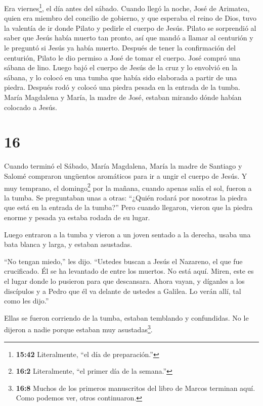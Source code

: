  Era viernes\footnote{\textbf{15:42} Literalmente, ``el día
  de preparación.''}, el día antes del sábado. Cuando llegó la noche,
 José de Arimatea, quien era miembro del concilio de
gobierno, y que esperaba el reino de Dios, tuvo la valentía de ir donde
Pilato y pedirle el cuerpo de Jesús.  Pilato se sorprendió
al saber que Jesús había muerto tan pronto, así que mandó a llamar al
centurión y le preguntó si Jesús ya había muerto.  Después
de tener la confirmación del centurión, Pilato le dio permiso a José de
tomar el cuerpo.  José compró una sábana de lino. Luego
bajó el cuerpo de Jesús de la cruz y lo envolvió en la sábana, y lo
colocó en una tumba que había sido elaborada a partir de una piedra.
Después rodó y colocó una piedra pesada en la entrada de la tumba.
 María Magdalena y María, la madre de José, estaban mirando
dónde habían colocado a Jesús.

\hypertarget{section-15}{%
\section{16}\label{section-15}}

 Cuando terminó el Sábado, María Magdalena, María la madre
de Santiago y Salomé compraron ungüentos aromáticos para ir a ungir el
cuerpo de Jesús.  Y muy temprano, el domingo\footnote{\textbf{16:2}
  Literalmente, ``el primer día de la semana.''} por la mañana, cuando
apenas salía el sol, fueron a la tumba.  Se preguntaban unas
a otras: ``¿Quién rodará por nosotras la piedra que está en la entrada
de la tumba?''  Pero cuando llegaron, vieron que la piedra
enorme y pesada ya estaba rodada de su lugar.

 Luego entraron a la tumba y vieron a un joven sentado a la
derecha, usaba una bata blanca y larga, y estaban asustadas.

 ``No tengan miedo,'' les dijo. ``Ustedes buscan a Jesús el
Nazareno, el que fue crucificado. Él se ha levantado de entre los
muertos. No está aquí.  Miren, este es el lugar donde lo
pusieron para que descansara. Ahora vayan, y díganles a los discípulos y
a Pedro que él va delante de ustedes a Galilea. Lo verán allí, tal como
les dijo.''

 Ellas se fueron corriendo de la tumba, estaban temblando y
confundidas. No le dijeron a nadie porque estaban muy
asustadas\footnote{\textbf{16:8} Muchos de los primeros manuscritos del
  libro de Marcos terminan aquí. Como podemos ver, otros continuaron.}.

